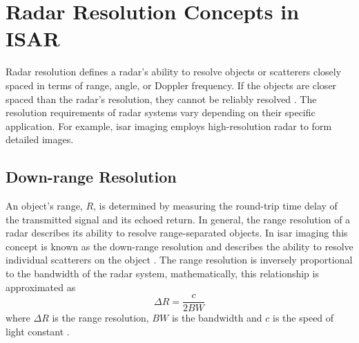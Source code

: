\documentclass[class=report,11pt,crop=false]{standalone}
\begin{document}
\section{Radar Resolution Concepts in ISAR \label{sec:theory_resolution}}
Radar resolution defines a radar's ability to resolve objects or scatterers closely spaced in terms of range, angle, or Doppler frequency. If the objects are closer spaced than the radar's resolution, they cannot be reliably resolved \cite{pomr}. The resolution requirements of radar systems vary depending on their specific application. For example, \gls{isar} imaging employs high-resolution radar to form detailed images.
    \subsection{Down-range Resolution}
    An object's range, $R$, is determined by measuring the round-trip time delay of the transmitted signal and its echoed return. In general, the range resolution of a radar describes its ability to resolve range-separated objects. In \gls{isar} imaging this concept is known as the down-range resolution and describes the ability to resolve individual scatterers on the object \cite{ISARtextbook_Martorella}. %
    The range resolution is inversely proportional to the bandwidth of the radar system, mathematically, this relationship is approximated as %
    \begin{equation} \label{eq:range_resolution}
    \Delta R = \frac{c}{2BW}
    \end{equation}
    where \(\Delta R\) is the range resolution, \(BW\) is the bandwidth and \(c\) is the speed of light constant \cite{pomr}. 
\end{document}
